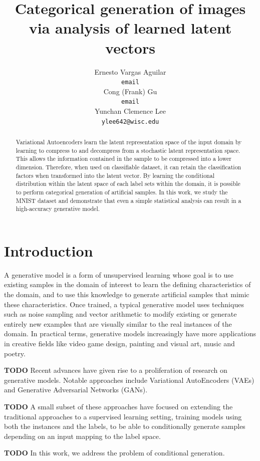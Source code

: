 \documentclass{article}
\title{Categorical generation of images via analysis of learned latent vectors}
\author{
  Ernesto Vargas Aguilar \\
  \texttt{email} \\
   \And
   Cong (Frank) Gu \\
   \texttt{email} \\
   \And
   Yunchan Clemence Lee \\
   \texttt{ylee642@wisc.edu} \\
}
\begin{document}

\maketitle

\begin{abstract}
Variational Autoencoders learn the latent representation space of the input domain by learning to compress to and decompress from a stochastic latent representation space. This allows the information contained in the sample to be compressed into a lower dimension. Therefore, when used on classifiable dataset, it can retain the classification factors when transformed into the latent vector. By learning the conditional distribution within the latent space of each label sets within the domain, it is possible to perform categorical generation of artificial samples. In this work, we study the MNIST dataset and demonstrate that even a simple statistical analysis can result in a high-accuracy generative model.
\end{abstract}

\section{Introduction}

A generative model is a form of unsupervised learning whose goal is to use existing 
samples in the domain of interest to learn the defining characteristics of the domain,
and to use this knowledge to generate artificial samples that mimic these characteristics.
Once trained, a typical generative model uses techniques such as noise sampling and vector arithmetic
to modify existing or generate entirely new examples that are visually similar to the real instances of the domain.
In practical terms, generative models increasingly have more applications in creative fields like video game design, 
painting and visual art, music and poetry. \par

\textbf{TODO} Recent advances have given rise to a proliferation of research on generative models. Notable approaches include Variational AutoEncoders (VAEs) and Generative Adversarial Networks (GANs). \par
\textbf{TODO} A small subset of these approaches have focused on extending the traditional approaches to a supervised learning setting, training models using both the instances and the labels, to be able to conditionally generate samples depending on an input mapping to the label space.\par
\textbf{TODO} In this work, we address the problem of conditional generation.
\end{document}
